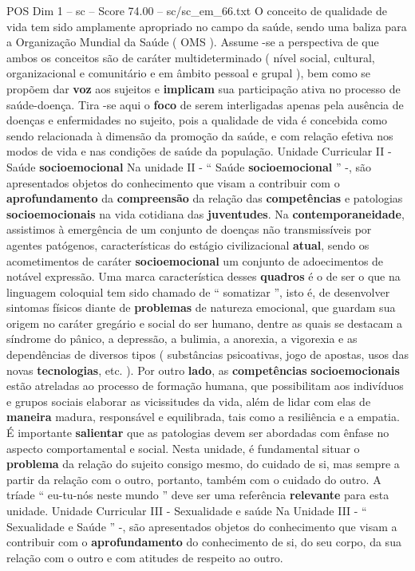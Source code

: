 \begin{textsample}{POS Dim 1 – sc – Score 74.00 – sc/sc\_em\_66.txt}
O conceito de qualidade de vida tem sido amplamente apropriado no campo da saúde, sendo uma baliza para a Organização Mundial da Saúde ( OMS ).
Assume -se a perspectiva de que ambos os conceitos são de caráter multideterminado ( nível social, cultural, organizacional e comunitário e em âmbito pessoal e grupal ), bem como se propõem dar \textbf{voz} aos sujeitos e \textbf{implicam} sua participação ativa no processo de saúde-doença.
Tira -se aqui o \textbf{foco} de serem interligadas apenas pela ausência de doenças e enfermidades no sujeito, pois a qualidade de vida é concebida como sendo relacionada à dimensão da promoção da saúde, e com relação efetiva nos modos de vida e nas condições de saúde da população.
Unidade Curricular II - Saúde \textbf{socioemocional} Na unidade II - “ Saúde \textbf{socioemocional} ” -, são apresentados objetos do conhecimento que visam a contribuir com o \textbf{aprofundamento} da \textbf{compreensão} da relação das \textbf{competências} e patologias \textbf{socioemocionais} na vida cotidiana das \textbf{juventudes}.
Na \textbf{contemporaneidade}, assistimos à emergência de um conjunto de doenças não transmissíveis por agentes patógenos, características do estágio civilizacional \textbf{atual}, sendo os acometimentos de caráter \textbf{socioemocional} um conjunto de adoecimentos de notável expressão.
Uma marca característica desses \textbf{quadros} é o de ser o que na linguagem coloquial tem sido chamado de “ somatizar ”, isto é, de desenvolver sintomas físicos diante de \textbf{problemas} de natureza emocional, que guardam sua origem no caráter gregário e social do ser humano, dentre as quais se destacam a síndrome do pânico, a depressão, a bulimia, a anorexia, a vigorexia e as dependências de diversos tipos ( substâncias psicoativas, jogo de apostas, usos das novas \textbf{tecnologias}, etc. ).
Por outro \textbf{lado}, as \textbf{competências} \textbf{socioemocionais} estão atreladas ao processo de formação humana, que possibilitam aos indivíduos e grupos sociais elaborar as vicissitudes da vida, além de lidar com elas de \textbf{maneira} madura, responsável e equilibrada, tais como a resiliência e a empatia.
É importante \textbf{salientar} que as patologias devem ser abordadas com ênfase no aspecto comportamental e social.
Nesta unidade, é fundamental situar o \textbf{problema} da relação do sujeito consigo mesmo, do cuidado de si, mas sempre a partir da relação com o outro, portanto, também com o cuidado do outro.
A tríade “ eu-tu-nós neste mundo ” deve ser uma referência \textbf{relevante} para esta unidade.
Unidade Curricular III - Sexualidade e saúde Na Unidade III - “ Sexualidade e Saúde ” -, são apresentados objetos do conhecimento que visam a contribuir com o \textbf{aprofundamento} do conhecimento de si, do seu corpo, da sua relação com o outro e com atitudes de respeito ao outro.

\end{textsample}
